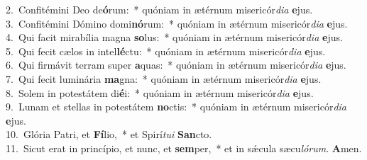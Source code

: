 {2.~}Confitémini Deo de\textbf{ó}rum:~* quóniam in ætérnum misericór\textit{di}\textit{a} \textbf{e}jus.\\
{3.~}Confitémini Dómino domi\textbf{nó}rum:~* quóniam in ætérnum misericór\textit{di}\textit{a} \textbf{e}jus.\\
{4.~}Qui facit mirabília magna \textbf{so}lus:~* quóniam in ætérnum misericór\textit{di}\textit{a} \textbf{e}jus.\\
{5.~}Qui fecit cælos in intel\textbf{lé}ctu:~* quóniam in ætérnum misericór\textit{di}\textit{a} \textbf{e}jus.\\
{6.~}Qui firmávit terram super \textbf{a}quas:~* quóniam in ætérnum misericór\textit{di}\textit{a} \textbf{e}jus.\\
{7.~}Qui fecit luminária \textbf{ma}gna:~* quóniam in ætérnum misericór\textit{di}\textit{a} \textbf{e}jus.\\
{8.~}Solem in potestátem di\textbf{é}i:~* quóniam in ætérnum misericór\textit{di}\textit{a} \textbf{e}jus.\\
{9.~}Lunam et stellas in potestátem \textbf{no}ctis:~* quóniam in ætérnum misericór\textit{di}\textit{a} \textbf{e}jus.\\
{10.~}Glória Patri, et \textbf{Fí}lio,~* et Spirí\textit{tu}\textit{i} \textbf{San}cto.\\
{11.~}Sicut erat in princípio, et nunc, et \textbf{sem}per,~* et in sǽcula sæcu\textit{ló}\textit{rum}. \textbf{A}men.\\
